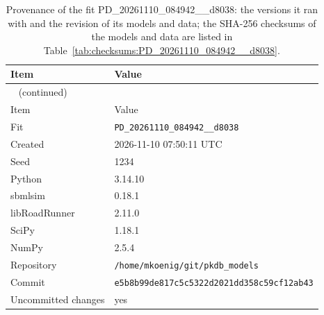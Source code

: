 \begin{longtable}{ll}
\caption{Provenance of the fit PD\_20261110\_084942\_\_d8038: the versions it ran with and the revision of its models and data; the SHA-256 checksums of the models and data are listed in Table~\ref{tab:checksums:PD_20261110_084942__d8038}.}\label{tab:provenance:PD_20261110_084942__d8038} \\
\toprule
Item & Value \\
\midrule
\endfirsthead
\multicolumn{2}{l}{\small\tablename~\thetable{} (continued)} \\
\toprule
Item & Value \\
\midrule
\endhead
\bottomrule
\endlastfoot
Fit & \texttt{PD\_20261110\_084942\_\_d8038} \\
Created & 2026-11-10 07:50:11 UTC \\
Seed & 1234 \\
Python & 3.14.10 \\
sbmlsim & 0.18.1 \\
libRoadRunner & 2.11.0 \\
SciPy & 1.18.1 \\
NumPy & 2.5.4 \\
Repository & \texttt{/home/mkoenig/git/pkdb\_models} \\
Commit & \texttt{e5b8b99de817c5c5322d2021dd358c59cf12ab43} \\
Uncommitted changes & yes \\
\end{longtable}



